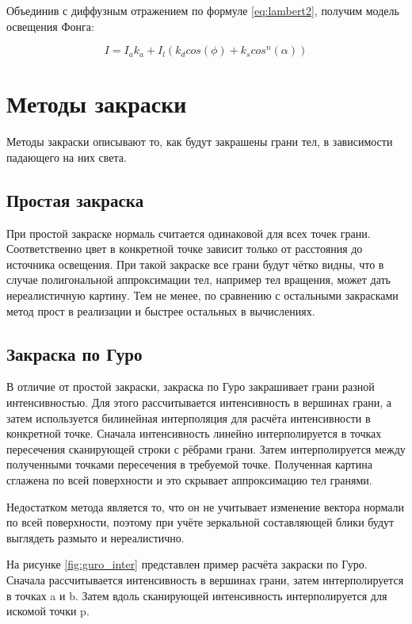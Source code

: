 Объединив с диффузным отражением по формуле \ref{eq:lambert2}, получим модель освещения Фонга:

\begin{equation}
	\label{eq:fong-model}
	I = I_ak_a + I_{l}(k_dcos(\phi) + k_scos^n(\alpha))
\end{equation}

\section{Методы закраски}
Методы закраски описывают то, как будут закрашены грани тел, в зависимости падающего на них света.

\subsection{Простая закраска}
При простой закраске нормаль считается одинаковой для всех точек грани. Соответственно цвет в конкретной точке зависит только от расстояния до источника освещения.
При такой закраске все грани будут чётко видны, что в случае полигональной аппроксимации тел, например тел вращения, может дать нереалистичную картину. Тем не менее, по сравнению с остальными закрасками метод прост в реализации и быстрее остальных в вычислениях.

\subsection{Закраска по Гуро}
В отличие от простой закраски, закраска по Гуро закрашивает грани разной интенсивностью. Для этого рассчитывается интенсивность в вершинах грани, а затем используется билинейная интерполяция для расчёта интенсивности в конкретной точке.
Сначала интенсивность линейно интерполируется в точках пересечения сканирующей строки с рёбрами грани. Затем интерполируется между полученными точками пересечения в требуемой точке. Полученная картина сглажена по всей поверхности и это скрывает аппроксимацию тел гранями.

Недостатком метода является то, что он не учитывает изменение вектора нормали по всей поверхности, поэтому при учёте зеркальной составляющей блики будут выглядеть размыто и нереалистично.

На рисунке \ref{fig:guro_inter} представлен пример расчёта закраски по Гуро. Сначала рассчитывается интенсивность в вершинах грани, затем интерполируется в точках a и b. Затем вдоль сканирующей  интенсивность интерполируется для искомой точки p.

